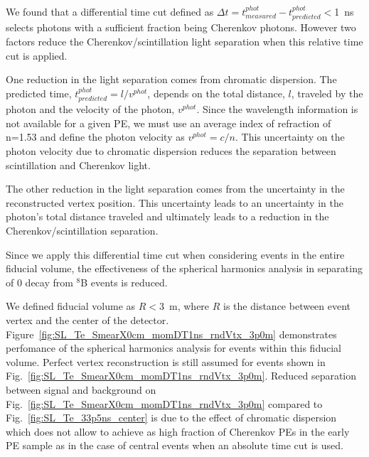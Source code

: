We found that a differential time cut defined as $\Delta t=t^{phot}_{measured} - t^{phot}_{predicted}<$1~ns selects photons with a 
sufficient fraction being Cherenkov photons. However two factors reduce the Cherenkov/scintillation light separation when this relative 
time cut is applied.

One reduction in the light separation comes from chromatic dispersion. The predicted time, $ t^{phot}_{predicted}=l/v^{phot}$, depends 
on the total distance, $l$, traveled by the photon and the velocity of the photon, $v^{phot}$.  Since the wavelength information is 
not available for a given PE, we must use an average index of refraction of n=1.53 and define the photon velocity as $v^{phot} = c/n$. 
This uncertainty on the photon velocity due to chromatic dispersion reduces the separation between scintillation and Cherenkov light. 

The other reduction in the light separation comes from the uncertainty in the reconstructed vertex position. This uncertainty leads to 
an uncertainty in the photon's total distance traveled and ultimately leads to a reduction in the Cherenkov/scintillation separation.

Since we apply this differential time cut when considering events in the entire fiducial volume, the effectiveness of the spherical 
harmonics analysis in separating of 0{\nbb} decay from $^{8}$B events is reduced. 

We defined fiducial volume as $R<3$~m, where $R$ is the distance between event vertex and the center of the detector.
Figure~\ref{fig:SL_Te_SmearX0cm_momDT1ns_rndVtx_3p0m} demonstrates perfomance of the spherical harmonics analysis for events within this
fiducial volume. Perfect vertex reconstruction is still assumed for events shown in Fig.~\ref{fig:SL_Te_SmearX0cm_momDT1ns_rndVtx_3p0m}. 
Reduced separation between signal and background on Fig.~\ref{fig:SL_Te_SmearX0cm_momDT1ns_rndVtx_3p0m} compared to 
Fig.~\ref{fig:SL_Te_33p5ns_center} is due to the effect of chromatic dispersion which does not allow to achieve as high fraction of 
Cherenkov PEs in the early PE sample as in the case of central events when an absolute time cut is used.


